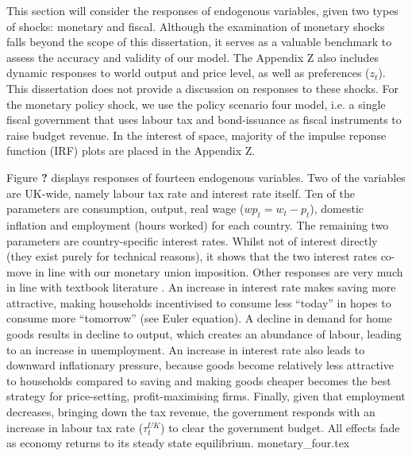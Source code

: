 This section will consider the responses of endogenous variables, given two types of shocks: monetary and fiscal. Although the examination of monetary shocks falls beyond the scope of this dissertation, it serves as a valuable benchmark to assess the accuracy and validity of our model. The Appendix Z also includes dynamic responses to world output and price level, as well as preferences ($z_t$). This dissertation does not provide a discussion on responses to these shocks. For the monetary policy shock, we use the policy scenario four model, i.e. a single fiscal government that uses labour tax and bond-issuance as fiscal instruments to raise budget revenue. In the interest of space, majority of the impulse reponse function (IRF) plots are placed in the Appendix Z. 

Figure \textbf{?} displays responses of fourteen endogenous variables. Two of the variables are UK-wide, namely labour tax rate and interest rate itself. Ten of the parameters are consumption, output, real wage ($wp_t = w_t - p_t$), domestic inflation and employment (hours worked) for each country. The remaining two parameters are country-specific interest rates. Whilst not of interest directly (they exist purely for technical reasons), it shows that the two interest rates co-move in line with our monetary union imposition. Other responses are very much in line with textbook literature \textcolor{red}{\parencite{jordigal_2015_monetary}}. An increase in interest rate makes saving more attractive, making households incentivised to consume less ``today'' in hopes to consume more ``tomorrow'' (see Euler equation). A decline in demand for home goods results in decline to output, which creates an abundance of labour, leading to an increase in unemployment. An increase in interest rate also leads to downward inflationary pressure, because goods become relatively less attractive to households compared to saving and making goods cheaper becomes the best strategy for price-setting, profit-maximising firms. Finally, given that employment decreases, bringing down the tax revenue, the government responds with an increase in labour tax rate ($\tau^{UK}_t$) to clear the government budget. All effects fade as economy returns to its steady state equilibrium.
{monetary_four.tex}

